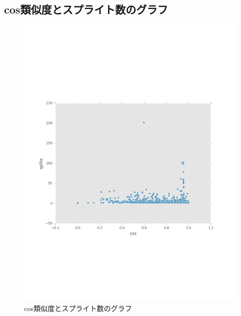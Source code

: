 \documentclass[a4paper,10pt,onecolumn,oneside,openany]{jsbook}
\begin{document}
 
\subsection{cos類似度とスプライト数のグラフ}
\begin{figure}[h]
  \centering
    \includegraphics[scale=0.8]{graphic/spl_graph.pdf}
  \caption{cos類似度とスプライト数のグラフ}
 \end{figure}




\end{document}
